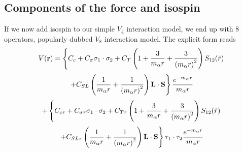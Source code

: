 \documentclass[%
twoside,                 %
final,                   %
10pt]{article}
\begin{document}
\subsection{Components of the force and isospin}
\begin{block}{}
If we now add isospin to our simple $V_4$ interaction model, we end up with $8$ operators, popularly dubbed $V_8$ interaction model. The explicit form reads
\[
V(\mathbf{r})= \left\{ C_c + C_\mathbf{\sigma} \mathbf{\sigma}_1\cdot\mathbf{\sigma}_2
 + C_T \left( 1 + {3\over m_\alpha r} + {3\over
\left(m_\alpha r\right)^2}\right) S_{12} (\hat r)\right. 
\]
\[
\left. + C_{SL} \left( {1\over m_\alpha r} + {1\over \left( m_\alpha r\right)^2}
\right) \mathbf{L}\cdot \mathbf{S}
\right\} \frac{e^{-m_\alpha r}}{m_\alpha r}
\]
\[
+ \left\{ C_{c\tau} + C_{\sigma\tau}\mathbf{\sigma}_1\cdot\mathbf{\sigma}_2
 + C_{T\tau} \left( 1 + {3\over m_\alpha r} + {3\over
\left(m_\alpha r\right)^2}\right) S_{12} (\hat r)\right. 
\]
\[
\left. + C_{SL\tau} \left( {1\over m_\alpha r} + {1\over \left( m_\alpha r\right)^2}
\right) \mathbf{L}\cdot \mathbf{S}
\right\}\mathbf{\tau}_1\cdot\mathbf{\tau}_2 \frac{e^{-m_\alpha r}}{m_\alpha r}
\]
\end{block}

\end{document}
